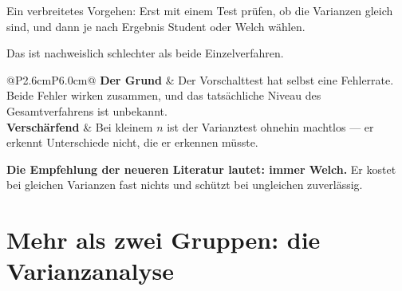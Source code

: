 \begin{warnung}
Ein verbreitetes Vorgehen: Erst mit einem Test prüfen, ob die Varianzen gleich sind, und dann je nach Ergebnis Student oder Welch wählen.

Das ist nachweislich schlechter als beide Einzelverfahren.

\begin{center}
\renewcommand{\arraystretch}{1.5}
\begin{tabular}{@{}P{2.6cm}P{6.0cm}@{}}
\toprule
\textbf{Der Grund} & Der Vorschalttest hat selbst eine Fehlerrate. Beide Fehler wirken zusammen, und das tatsächliche Niveau des Gesamtverfahrens ist unbekannt.\\
\textbf{Verschärfend} & Bei kleinem $n$ ist der Varianztest ohnehin machtlos --- er erkennt Unterschiede nicht, die er erkennen müsste.\\
\bottomrule
\end{tabular}
\end{center}

\begin{center}
\begin{minipage}{0.9\textwidth}
\textbf{Die Empfehlung der neueren Literatur lautet: immer Welch.} Er kostet bei gleichen Varianzen fast nichts und schützt bei ungleichen zuverlässig.
\end{minipage}
\end{center}

\begin{center}
\begin{minipage}{0.88\textwidth}
\end{minipage}
\end{center}
\end{warnung}

\section{Mehr als zwei Gruppen: die Varianzanalyse}

